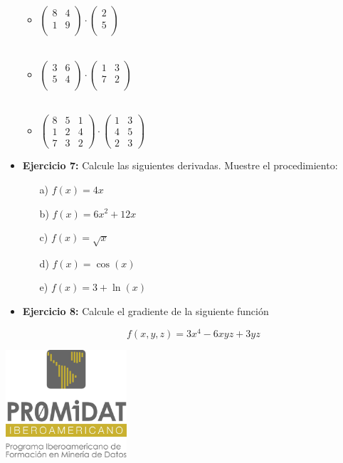 \documentclass[spanish,12pt]{report}
\begin{document}
\begin{itemize}
\begin{itemize}
    \item $
\begin{pmatrix}
    8 & 4  \\
    1 & 9  \\
\end{pmatrix} \cdot
\begin{pmatrix}
    2 \\
    5 \\
\end{pmatrix}
$
\\
\\
    \item $
\begin{pmatrix}
    3 & 6  \\
    5 & 4  \\
\end{pmatrix} \cdot
\begin{pmatrix}
    1 & 3 \\
    7 & 2 \\
\end{pmatrix}
$
\\
\\
    \item $
\begin{pmatrix}
    8 & 5 & 1 \\
    1 & 2 & 4 \\
    7 & 3 & 2
\end{pmatrix} \cdot
\begin{pmatrix}
    1 & 3 \\
    4 & 5 \\
    2 & 3
\end{pmatrix}
$
\end{itemize}

\item {\bf{\color{Red} Ejercicio 7:}} {\sf [15 puntos]} Calcule las siguientes derivadas. Muestre el procedimiento:

\begin{itemize}
    \item[a)] $f(x) = 4x$
    \item[b)] $f(x) = 6x^2 + 12x$
    \item[c)] $f(x) = \sqrt{x}$
    \item[d)] $f(x) = \cos(x)$
     \item[e)] $f(x) = 3 + \ln(x)$
\end{itemize}

\item {\bf{\color{Red} Ejercicio 8:}} {\sf [5 puntos]} Calcule el gradiente de la siguiente función

$$
f(x,y,z) = 3x^4 - 6xyz + 3yz
$$

\end{itemize}


\vspace{2cm}

\begin{center}
\includegraphics[height=4cm]{logo.jpg}
\end{center}
\end{document}
